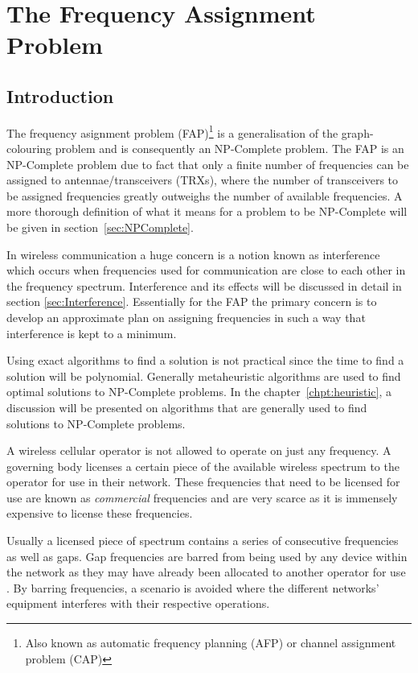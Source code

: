 \chapter{The Frequency Assignment Problem}
\label{chpt:fap}
\section{Introduction}
The frequency asignment problem (FAP)\footnote{Also known as automatic frequency planning (AFP) or channel assignment problem (CAP)\cite{ACOvsEA}} is a generalisation of the graph-colouring problem and is consequently an NP-Complete problem\cite{FAPRAMColouring}. The FAP is an NP-Complete problem due to fact that only a finite number of frequencies can be assigned to antennae/transceivers (TRXs), where the number of transceivers to be assigned frequencies greatly outweighs the number of available frequencies\cite{FAPRAMColouring}. A more thorough definition of what it means for a problem to be NP-Complete will be given in section~\ref{sec:NPComplete}.

In wireless communication a huge concern is a notion known as interference which occurs when frequencies used for communication are close to each other in the frequency spectrum\cite{Karen2004}. Interference and its effects will be discussed in detail in section \ref{sec:Interference}. Essentially for the FAP the primary concern is to develop an approximate plan on assigning frequencies in such a way that interference is kept to a minimum. 

Using exact algorithms to find a solution is not practical since the time to find a solution will be polynomial. Generally metaheuristic algorithms are used to find optimal solutions to NP-Complete problems\cite{ACOvsEA}. In the chapter~\ref{chpt:heuristic}, a discussion will be presented on algorithms that are generally used to find solutions to NP-Complete problems. 

A wireless cellular operator is not allowed to operate on just any frequency. A governing body licenses a certain piece of the available wireless spectrum to the operator for use in their network\cite{FAPRAMColouring}. These frequencies that need to be licensed for use are known as \emph{commercial} frequencies and are very scarce as it is immensely expensive to license these frequencies\cite{FAPRAMColouring}. 

Usually a licensed piece of spectrum contains a series of consecutive frequencies as well as gaps. Gap frequencies are barred from being used by any device within the network as they may have already been allocated to another operator for use \cite{FAPInCell}. By barring frequencies, a scenario is avoided where the different networks' equipment interferes with their respective operations\cite{FAPInCell}.

